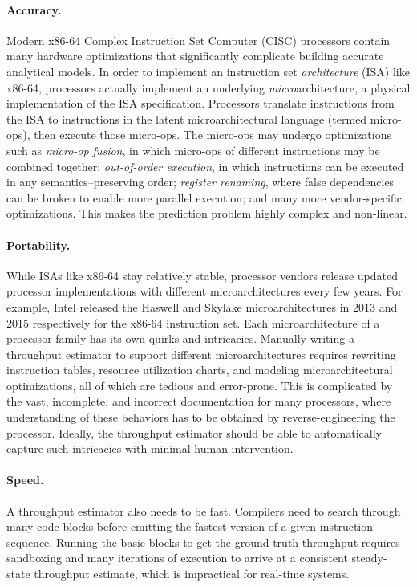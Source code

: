 \paragraph{\bf Accuracy.}
Modern x86-64 Complex Instruction Set Computer (CISC) processors contain many hardware optimizations that significantly complicate building accurate analytical models.
In order to implement an instruction set \emph{architecture} (ISA) like x86-64, processors actually implement an underlying \emph{micro}architecture, a physical implementation of the ISA specification.
Processors translate instructions from the ISA to instructions in the latent microarchitectural language (termed micro-ops), then execute those micro-ops.
The micro-ops may undergo optimizations such as
\textit{micro-op fusion}, in which micro-ops of different instructions may be combined together;
\textit{out-of-order execution}, in which instructions can be executed in any semantics--preserving order;
\textit{register renaming}, where false dependencies can be broken to enable more parallel execution;
and many more vendor-specific optimizations.
This makes the prediction problem highly complex and non-linear.

\paragraph{\bf Portability.}
While ISAs like x86-64 stay relatively stable, processor vendors release updated processor implementations with different microarchitectures every few years.
For example, Intel released the Haswell and Skylake microarchitectures in 2013 and 2015 respectively for the x86-64 instruction set.
Each microarchitecture of a processor family has its own quirks and intricacies.
Manually writing a throughput estimator to support different microarchitectures requires rewriting instruction tables, resource utilization charts, and modeling microarchitectural optimizations, all of which are tedious and error-prone.
This is complicated by the vast, incomplete, and incorrect documentation for many processors, where understanding of these behaviors has to be obtained by reverse-engineering the processor.
Ideally, the throughput estimator should be able to automatically capture such intricacies with minimal human intervention.

\paragraph{\bf Speed.} A throughput estimator also needs to be fast.
Compilers need to search through many code blocks before emitting the fastest version of a given instruction sequence.
Running the basic blocks to get the ground truth throughput requires sandboxing and many iterations of execution to arrive at a consistent steady-state throughput estimate, which is impractical for real-time systems.

